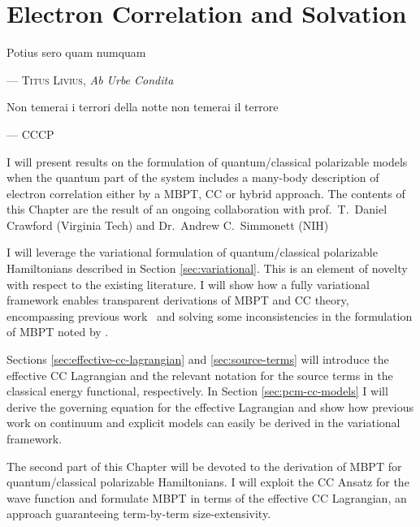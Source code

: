 \chapter{Electron Correlation and Solvation}\label{ch:solvation-correlation}

\epigraph{Potius sero quam numquam}{--- \textsc{Titus Livius}, \textit{Ab Urbe Condita}}
\epigraph{\textitalian{Non temerai i terrori della notte non temerai il terrore}}{--- \textsc{CCCP}}

I will present results on the formulation of quantum/classical
polarizable models when the quantum part of the system includes a
many-body description of electron correlation either by a \gls{MBPT},
\gls{CC} or hybrid approach.
The contents of this Chapter are the result of an ongoing collaboration
with prof.~T.~Daniel Crawford (Virginia Tech) and Dr.~Andrew
C.~Simmonett (NIH)

I will leverage the variational formulation of quantum/classical
polarizable Hamiltonians described in Section \ref{sec:variational}.
This is an element of novelty with respect to the existing literature.
I will show how a fully variational framework enables transparent
derivations of \acrshort{MBPT} and \acrshort{CC} theory, encompassing
previous work~\autocite{Christiansen1999-tj, Cammi2009-gu,
Caricato2010-hx, Caricato2011-tx, Olivares_del_Valle1991-of,
Aguilar1991-vq, Olivares_del_Valle1991-tq, Olivares_del_Valle1993-xq,
Olivares_del_Valle1993-ra, Surjan1983-oc, Angyan1991-mr, Angyan1993-ay,
Angyan2008-nj, Nielsen2001-yl, Kongsted2003-py, Sneskov2010-dz,
Sneskov2011-jm, Schwabe2012-cf}
and solving some inconsistencies in the formulation of \acrshort{MBPT}
noted by \citeauthor{Angyan1995-co}.\autocite{Angyan1995-co,
Lipparini2009-io}

Sections \ref{sec:effective-cc-lagrangian} and \ref{sec:source-terms}
will introduce the effective \acrshort{CC} Lagrangian and the relevant
notation for the source terms in the classical energy functional,
respectively.
In Section \ref{sec:pcm-cc-models} I will derive the governing equation
for the effective Lagrangian and show how previous work on
continuum\autocite{Christiansen1999-tj, Cammi2009-gu, Caricato2011-tx}
and explicit models\autocite{Kongsted2003-py, Sneskov2011-jm} can easily
be derived in the variational framework.

The second part of this Chapter will be devoted to the derivation of
\acrshort{MBPT} for quantum/classical polarizable Hamiltonians.
I will exploit the \acrshort{CC} Ansatz for the wave function and formulate
\acrshort{MBPT} in terms of the effective \acrshort{CC} Lagrangian, an approach
guaranteeing term-by-term size-extensivity.

